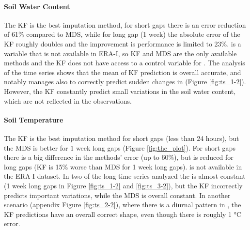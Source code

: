 \documentclass{article}
\begin{document}
\paragraph{Soil Water Content} The KF is the best imputation method, for short gaps there is an error reduction of 61\% compared to MDS, while for long gap (1 week) the absolute error of the KF roughly doubles and the improvement is performance is limited to 23\%.  is a variable that is not available in ERA-I, so KF and MDS are the only available methods and the KF does not have access to a control variable for .
The analysis of the time series shows that the mean of KF prediction is overall accurate, and notably manages also to correctly predict sudden changes in  (Figure \ref{fig:ts_1-2}). However, the KF constantly predict small variations in the soil water content, which are not reflected in the observations.

\paragraph{Soil Temperature} The KF is the best imputation method for short gaps (less than 24 hours), but the MDS is better for 1 week long gaps (Figure \ref{fig:the_plot}). For short gaps there is a big difference in the methods' error (up to 60\%), but is reduced for long gaps (KF is 15\% worse than MDS for 1 week long gaps).
 is not available in the ERA-I dataset.
In two of the long time series analyzed the  is almost constant (1 week long gaps in Figure \ref{fig:ts_1-2} and \ref{fig:ts_3-2}), but the KF incorrectly predicts important variations, while the MDS is overall constant. In another scenario (appendix Figure \ref{fig:ts_2-2}), where there is a diurnal pattern in , the KF predictions have an overall correct shape, even though there is roughly 1 °C error.


\newcommand{\CapTs}[2]{#1 to visualize the imputation of #2 using different methods: Kalman Filter (KF), ERA-Interim (ERA-I) and Marginal Distribution Sampling (MDS). For each variable, three random artificial gap (length 6 hours, 12 hours, 1 week) are imputed using the three methods: Kalman Filter (green), ERA-I (orange), MDS (purple).  For the KF the shared area show the uncertainty of the prediction $\pm 2 \sigma$ (standard deviation). The grey shaded area and the vertical black lines delimit the artificial gaps, where the observations are not available to the model but are used to assess the imputation performance. The ERA-I prediction is the control variable of the KF. The KF model has been fine-tuned to each variable (\textit{KF-\textlangle var\textrangle-Sin-6\_336}).}
\end{document}
